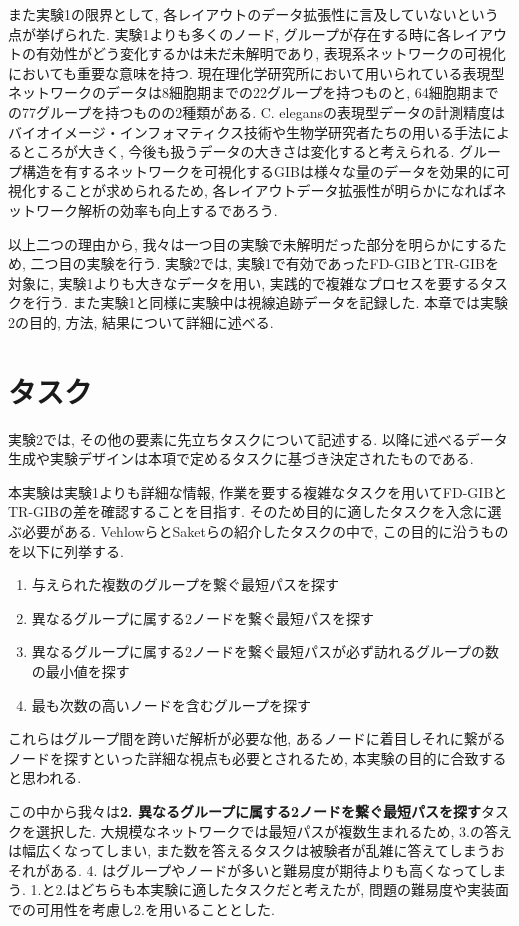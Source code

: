 \documentclass{kuee}
\begin{document}
また実験1の限界として, 各レイアウトのデータ拡張性に言及していないという点が挙げられた.
実験1よりも多くのノード, グループが存在する時に各レイアウトの有効性がどう変化するかは未だ未解明であり, 表現系ネットワークの可視化においても重要な意味を持つ.
現在理化学研究所において用いられている表現型ネットワークのデータは8細胞期までの22グループを持つものと, 64細胞期までの77グループを持つものの2種類がある.
C. elegansの表現型データの計測精度はバイオイメージ・インフォマティクス技術や生物学研究者たちの用いる手法によるところが大きく, 今後も扱うデータの大きさは変化すると考えられる.
グループ構造を有するネットワークを可視化するGIBは様々な量のデータを効果的に可視化することが求められるため, 各レイアウトデータ拡張性が明らかになればネットワーク解析の効率も向上するであろう.

以上二つの理由から, 我々は一つ目の実験で未解明だった部分を明らかにするため, 二つ目の実験を行う.
実験2では, 実験1で有効であったFD-GIBとTR-GIBを対象に, 実験1よりも大きなデータを用い, 実践的で複雑なプロセスを要するタスクを行う.
また実験1と同様に実験中は視線追跡データを記録した.
本章では実験2の目的, 方法, 結果について詳細に述べる.

\section{タスク}
\label{sec:task-ex2}

実験2では, その他の要素に先立ちタスクについて記述する.
以降に述べるデータ生成や実験デザインは本項で定めるタスクに基づき決定されたものである.

本実験は実験1よりも詳細な情報, 作業を要する複雑なタスクを用いてFD-GIBとTR-GIBの差を確認することを目指す.
そのため目的に適したタスクを入念に選ぶ必要がある.
Vehlowら\cite{Vehlow2017VisualizingGS}とSaketら\cite{saket2014group}の紹介したタスクの中で, この目的に沿うものを以下に列挙する.
\begin{enumerate}
  \item 与えられた複数のグループを繋ぐ最短パスを探す
  \item 異なるグループに属する2ノードを繋ぐ最短パスを探す
  \item 異なるグループに属する2ノードを繋ぐ最短パスが必ず訪れるグループの数の最小値を探す
  \item 最も次数の高いノードを含むグループを探す
\end{enumerate}
これらはグループ間を跨いだ解析が必要な他, あるノードに着目しそれに繋がるノードを探すといった詳細な視点も必要とされるため, 本実験の目的に合致すると思われる.

この中から我々は{\bf 2. 異なるグループに属する2ノードを繋ぐ最短パスを探す}タスクを選択した.
大規模なネットワークでは最短パスが複数生まれるため, 3.の答えは幅広くなってしまい, また数を答えるタスクは被験者が乱雑に答えてしまうおそれがある.
4. はグループやノードが多いと難易度が期待よりも高くなってしまう.
1.と2.はどちらも本実験に適したタスクだと考えたが, 問題の難易度や実装面での可用性を考慮し2.を用いることとした.
\end{document}
